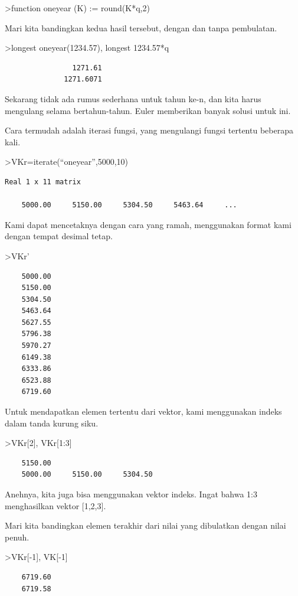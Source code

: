 \documentclass[
]{book}
\begin{document}
\textgreater function oneyear (K) := round(K*q,2)

Mari kita bandingkan kedua hasil tersebut, dengan dan tanpa pembulatan.

\textgreater longest oneyear(1234.57), longest 1234.57*q

\begin{verbatim}
                1271.61 
              1271.6071 
\end{verbatim}

Sekarang tidak ada rumus sederhana untuk tahun ke-n, dan kita harus mengulang selama bertahun-tahun. Euler memberikan banyak solusi untuk ini.

Cara termudah adalah iterasi fungsi, yang mengulangi fungsi tertentu beberapa kali.

\textgreater VKr=iterate(``oneyear'',5000,10)

\begin{verbatim}
Real 1 x 11 matrix

    5000.00     5150.00     5304.50     5463.64     ...
\end{verbatim}

Kami dapat mencetaknya dengan cara yang ramah, menggunakan format kami dengan tempat desimal tetap.

\textgreater VKr'

\begin{verbatim}
    5000.00 
    5150.00 
    5304.50 
    5463.64 
    5627.55 
    5796.38 
    5970.27 
    6149.38 
    6333.86 
    6523.88 
    6719.60 
\end{verbatim}

Untuk mendapatkan elemen tertentu dari vektor, kami menggunakan indeks dalam tanda kurung siku.

\textgreater VKr{[}2{]}, VKr{[}1:3{]}

\begin{verbatim}
    5150.00 
    5000.00     5150.00     5304.50 
\end{verbatim}

Anehnya, kita juga bisa menggunakan vektor indeks. Ingat bahwa 1:3 menghasilkan vektor {[}1,2,3{]}.

Mari kita bandingkan elemen terakhir dari nilai yang dibulatkan dengan nilai penuh.

\textgreater VKr{[}-1{]}, VK{[}-1{]}

\begin{verbatim}
    6719.60 
    6719.58 
\end{verbatim}
\end{document}
